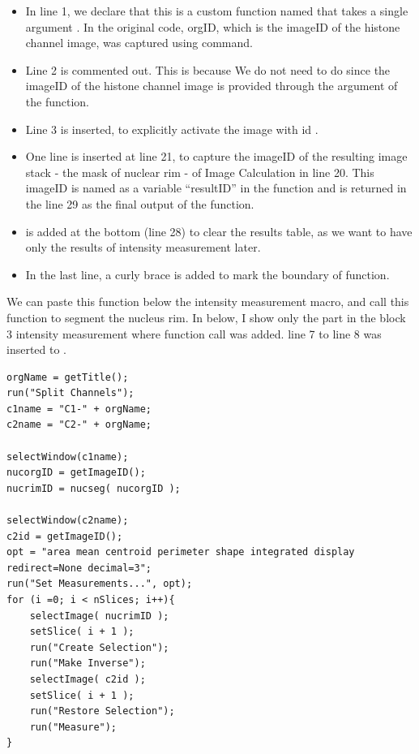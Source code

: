 \begin{itemize}
    \item In line 1, we declare that this is a custom function named  that takes a single argument . In the original code, orgID, which is the imageID of the histone channel image, was captured using  command. 
    \item Line 2 is commented out. This is because We do not need to do  since the imageID of the  histone channel image is provided through the argument of the function.
    \item Line 3 is inserted, to explicitly activate the image with id . 
    \item One line is inserted at line 21, to capture the imageID of the resulting image stack - the mask of nuclear rim - of Image Calculation in line 20. This imageID is named as a variable ``resultID'' in the function and is returned in the line 29 as the final output of the function.
    \item {} is added at the bottom (line 28) to clear the results table, as we want to have only the results of intensity measurement later.
    \item  In the last line, a curly brace is added to mark the boundary of function.
\end{itemize}

We can paste this function  below the intensity measurement macro, and call this function to segment the nucleus rim. In below, I show only the part in the block 3 intensity measurement where function call was added. line 7 to line 8 was inserted to . 

\begin{lstlisting}
orgName = getTitle();
run("Split Channels");
c1name = "C1-" + orgName;
c2name = "C2-" + orgName;

selectWindow(c1name);
nucorgID = getImageID();
nucrimID = nucseg( nucorgID );

selectWindow(c2name);
c2id = getImageID();
opt = "area mean centroid perimeter shape integrated display redirect=None decimal=3";
run("Set Measurements...", opt);
for (i =0; i < nSlices; i++){
    selectImage( nucrimID );
    setSlice( i + 1 );
    run("Create Selection");
    run("Make Inverse");
    selectImage( c2id );
    setSlice( i + 1 );
    run("Restore Selection");
    run("Measure");
}
\end{lstlisting}

